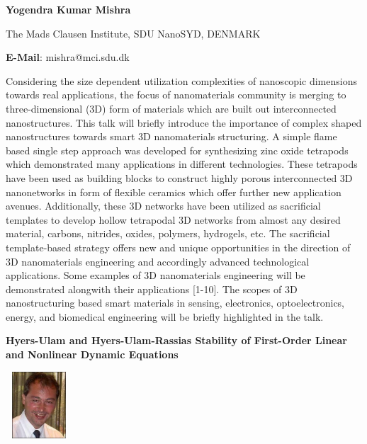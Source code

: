 \documentclass[twoside,11pt]{amsart}
\begin{document}
\vskip 2mm
\centerline{\textbf{ Yogendra Kumar Mishra }}
\vskip 5mm
\begin{flushleft}

The Mads Clausen Institute, SDU NanoSYD, DENMARK
\end{flushleft}
\vskip 2mm
\begin{flushleft}
\textbf{E-Mail}: mishra@mci.sdu.dk
\end{flushleft}

\vskip 8mm
Considering the size dependent utilization complexities of nanoscopic dimensions towards real applications, the focus of nanomaterials community is merging to three-dimensional (3D) form of materials which are built out interconnected nanostructures. This talk will briefly introduce the importance of complex shaped nanostructures towards smart 3D nanomaterials structuring. A simple flame based single step approach was developed for synthesizing zinc oxide tetrapods which demonstrated many applications in different technologies. These tetrapods have been used as building blocks to construct highly porous interconnected 3D nanonetworks in form of flexible ceramics which offer further new application avenues. Additionally, these 3D networks have been utilized as sacrificial templates to develop hollow tetrapodal 3D networks from almost any desired material, carbons, nitrides, oxides, polymers, hydrogels, etc. The sacrificial template-based strategy offers new and unique opportunities in the direction of 3D nanomaterials engineering and accordingly advanced technological applications. Some examples of 3D nanomaterials engineering will be demonstrated alongwith their applications [1-10]. The scopes of 3D nanostructuring based smart materials in sensing, electronics, optoelectronics, energy, and biomedical engineering will be briefly highlighted in the talk.
\vskip 5mm



\newpage

\vskip 10mm
\begin{center}\bf\LARGE
Hyers-Ulam and Hyers-Ulam-Rassias Stability of
First-Order Linear and Nonlinear Dynamic Equations
\end{center}
\vskip 5mm
\begin{center}
\includegraphics[width=2.5cm, height=2.5cm,keepaspectratio=false]{MB2.jpg}
\end{center}
\vskip 2mm
\end{document}
